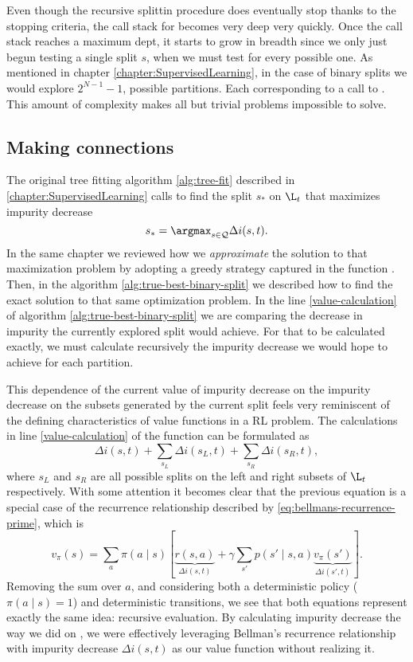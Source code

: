 Even though the recursive splittin procedure does eventually stop thanks to the
stopping criteria, the call stack for \TrueBestSplit becomes very deep very
quickly. Once the call stack reaches a maximum dept, it starts to grow in
breadth since we only just begun testing a single split $s$, when we must test
for every possible one. As mentioned in chapter
\ref{chapter:SupervisedLearning}, in the case of binary splits we would explore
$2^{N -1}-1$, possible partitions. Each corresponding to a call to
\TrueBestSplit. This amount of complexity makes all but trivial problems
impossible to solve. 

\subsection{Making connections}

The original tree fitting algorithm \ref{alg:tree-fit} described in
\ref{chapter:SupervisedLearning} calls to find the split $s_*$ on $\L_t$ that
maximizes impurity decrease
\[
    s_* = \argmax_{s \in \mathcal{Q}} \Delta i(s, t).
\]
In the same chapter we reviewed how we \emph{approximate} the solution to that
maximization problem by adopting a greedy strategy captured in the function
\GreedyBestSplit. Then, in the algorithm \ref{alg:true-best-binary-split} we
described how to find the exact solution to that same optimization problem. In
the line \ref{value-calculation} of algorithm \ref{alg:true-best-binary-split}
we are comparing the decrease in impurity the currently explored split would
achieve.  For that to be calculated exactly, we must calculate recursively the
impurity decrease we would hope to achieve for each partition.

This dependence of the current value of impurity decrease on the impurity
decrease on the subsets generated by the current split feels very reminiscent of
the defining characteristics of value functions in a RL problem. The
calculations in line \ref{value-calculation} of the function \TrueBestSplit can
be formulated as
\[
    \Delta i(s, t) + \sum_{s_L} \Delta i(s_L, t) + \sum_{s_R} \Delta i(s_R, t),
\]
where $s_L$ and $s_R$ are all possible splits on the left and right subsets of
$\L_t$ respectively. With some attention it becomes clear that the previous
equation is a special case of the recurrence relationship described by
\eqref{eq:bellmans-recurrence-prime}, which is
\[
    v_\pi (s) = 
    \sum_{a} \pi(a \mid s) \left[ 
        \underbrace{r(s,a)}_{\Delta i(s, t)} 
        + \gamma \sum_{s'} p(s' \mid s, a) \underbrace{v_\pi (s')}_{\Delta i(s', t)} 
    \right].
\]
Removing the sum over $a$, and considering both a deterministic policy ($\pi(a
\mid s) = 1$) and deterministic transitions, we see that both equations
represent exactly the same idea: recursive evaluation. By calculating impurity
decrease the way we did on \TrueBestSplit, we were effectively leveraging
Bellman's recurrence relationship with impurity decrease $\Delta i(s, t)$ as our
value function without realizing it.

